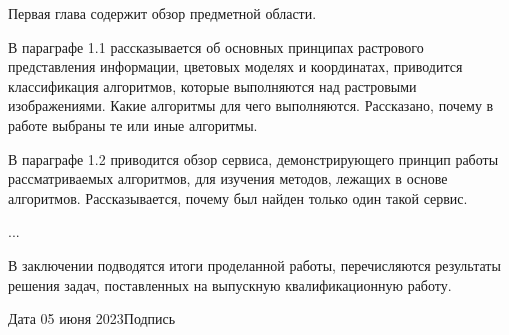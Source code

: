 \documentclass[14pt]{extarticle} %
\begin{document}
Первая глава содержит обзор предметной области.

В параграфе 1.1 рассказывается об основных принципах растрового представления информации, цветовых моделях и координатах, приводится классификация алгоритмов, которые выполняются над растровыми изображениями. Какие алгоритмы для чего выполняются. Рассказано, почему в работе выбраны те или иные алгоритмы.

В параграфе 1.2 приводится обзор сервиса, демонстрирующего принцип работы рассматриваемых алгоритмов, для изучения методов, лежащих в основе алгоритмов. Рассказывается, почему был найден только один такой сервис.

...

В заключении подводятся итоги проделанной работы, перечисляются результаты решения задач, поставленных на выпускную квалификационную работу.

\renewcommand{\refname}{Список использованных в  выпускной квалификационной работе источников}
\printbibliography
\nopagebreak
\vspace{1cm}
Дата 05 июня 2023\hspace{6cm}Подпись
\end{document}

